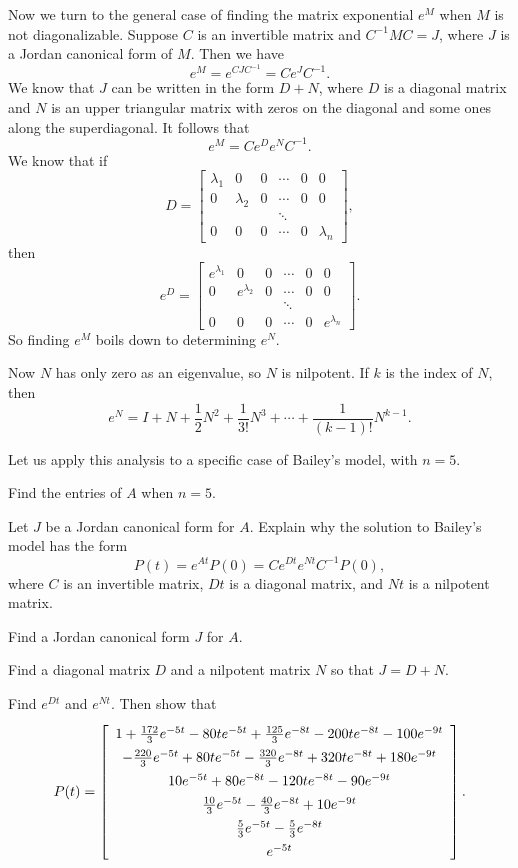 Now we turn to the general case of finding the matrix exponential $e^M$ when $M$ is not diagonalizable. Suppose $C$ is an invertible matrix and $C^{-1}MC = J$, where $J$ is a Jordan canonical form of $M$. Then we have 
\[e^M = e^{CJC^{-1}} = C e^J C^{-1}.\]
We know that $J$ can be written in the form $D+N$, where $D$ is a diagonal matrix and $N$ is an upper triangular matrix with zeros on the diagonal and some ones along the superdiagonal. It follows that
\[e^M = Ce^De^NC^{-1}.\]
We know that if 
\[D = \left[ \begin{array}{cccccc} \lambda_1&0&0&\cdots&0&0 \\  0&\lambda_2&0&\cdots&0&0 \\ &&&\ddots&& \\ 0&0&0&\cdots&0&\lambda_n \end{array} \right],\]
 then 
\[e^D = \left[ \begin{array}{cccccc} e^{\lambda_1}&0&0&\cdots&0&0 \\  0&e^{\lambda_2}&0&\cdots&0&0 \\ &&&\ddots&& \\ 0&0&0&\cdots&0&e^{\lambda_n} \end{array} \right].\]
So finding $e^M$ boils down to determining $e^N$. 

Now $N$ has only zero as an eigenvalue, so $N$ is nilpotent. If $k$ is the index of $N$, then
\[e^N = I + N + \frac{1}{2}N^2 + \frac{1}{3!}N^3 + \cdots + \frac{1}{(k-1)!}N^{k-1}.\]

\begin{pactivity} Let us apply this analysis to a specific case of Bailey's model, with $n = 5$.  
\ba
\item Find the entries of $A$ when $n = 5$. 

\item Let $J$ be a Jordan canonical form for $A$. Explain why the solution to Bailey's model has the form 
\[P(t)= e^{At}P(0) = Ce^{Dt}e^{Nt}C^{-1}P(0),\]
where $C$ is an invertible matrix, $Dt$ is a diagonal matrix, and $Nt$ is a nilpotent matrix.

\item Find a Jordan canonical form $J$ for $A$. 

\item Find a diagonal matrix $D$ and a nilpotent matrix $N$ so that $J = D+N$. 

\item Find $e^{Dt}$ and $e^{Nt}$. Then show that 
\[P(t) = \left[ \renewcommand{\arraystretch}{1.4} \begin{array}{c} 
1+\frac{172}{3}e^{-5t}-80te^{-5t}+\frac{125}{3}e^{-8t}-200te^{-8t}-100e^{-9t} \\ 
-\frac{220}{3}e^{-5t}+80te^{-5t}-\frac {320}{3}e^{-8t}+320te^{-8t} +180e^{-9t} \\ 
10e^{-5t}+80e^{-8t}-120te^{-8t}-90e^{-9t} \\ 
\frac{10}{3}e^{-5t}-\frac{40}{3}e^{-8t}+10e^{-9t} \\ 
\frac{5}{3}e^{-5t}- \frac{5}{3}e^{-8t} \\ 
e^{-5t}\end {array} \right].\]   

\ea

\end{pactivity}

